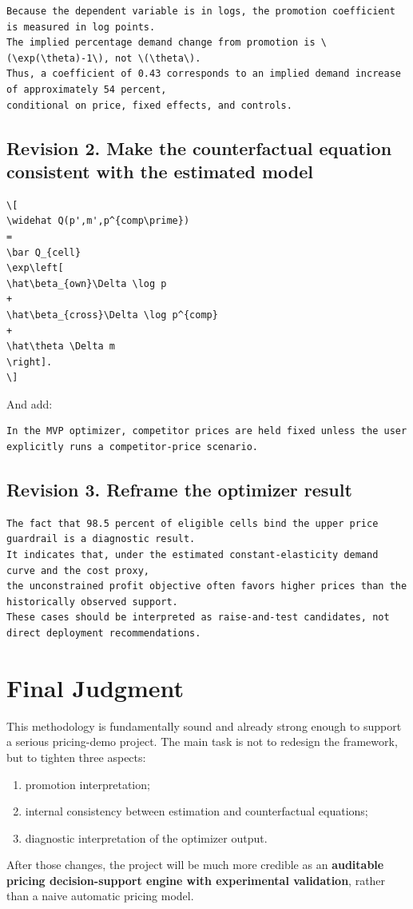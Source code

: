 \documentclass[11pt]{article}
\begin{document}
\begin{verbatim}
Because the dependent variable is in logs, the promotion coefficient is measured in log points.
The implied percentage demand change from promotion is \(\exp(\theta)-1\), not \(\theta\).
Thus, a coefficient of 0.43 corresponds to an implied demand increase of approximately 54 percent,
conditional on price, fixed effects, and controls.
\end{verbatim}

\subsection*{Revision 2. Make the counterfactual equation consistent with the estimated model}

\begin{verbatim}
\[
\widehat Q(p',m',p^{comp\prime})
=
\bar Q_{cell}
\exp\left[
\hat\beta_{own}\Delta \log p
+
\hat\beta_{cross}\Delta \log p^{comp}
+
\hat\theta \Delta m
\right].
\]
\end{verbatim}

And add:

\begin{verbatim}
In the MVP optimizer, competitor prices are held fixed unless the user explicitly runs a competitor-price scenario.
\end{verbatim}

\subsection*{Revision 3. Reframe the optimizer result}

\begin{verbatim}
The fact that 98.5 percent of eligible cells bind the upper price guardrail is a diagnostic result.
It indicates that, under the estimated constant-elasticity demand curve and the cost proxy,
the unconstrained profit objective often favors higher prices than the historically observed support.
These cases should be interpreted as raise-and-test candidates, not direct deployment recommendations.
\end{verbatim}

\section*{Final Judgment}

This methodology is fundamentally sound and already strong enough to support a serious pricing-demo project. The main task is not to redesign the framework, but to tighten three aspects:

\begin{enumerate}[leftmargin=1.5em]
    \item promotion interpretation;
    \item internal consistency between estimation and counterfactual equations;
    \item diagnostic interpretation of the optimizer output.
\end{enumerate}

After those changes, the project will be much more credible as an \textbf{auditable pricing decision-support engine with experimental validation}, rather than a naive automatic pricing model.
\end{document}
